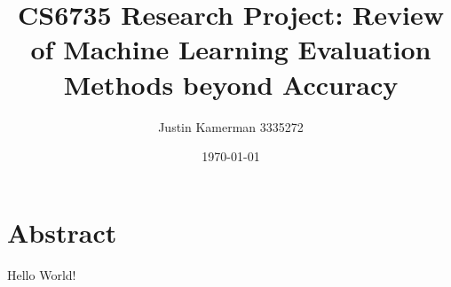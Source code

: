 \documentclass[10pt]{report}
\title{CS6735 Research Project: Review of Machine Learning Evaluation
  Methods beyond Accuracy}
\author{Justin Kamerman 3335272}
\date{\today}
\begin{document}
\maketitle
\renewcommand*\thesection{\arabic{section}}

\section*{Abstract}
\cite{*}
Hello World!




\end{document}
